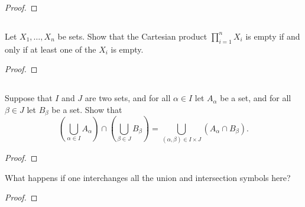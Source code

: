\documentclass[../../main.tex]{subfiles}
\begin{document}
\begin{proof}
    
\end{proof}
\begin{xx}
    
\end{xx}

\subsection{}
\begin{q}
    Let $X_1, \ldots, X_n$ be sets. Show that the Cartesian product $\prod_{i=1}^n X_i$ is empty if and only if at least one of the $X_i$ is empty.
\end{q}

\begin{proof}
    
\end{proof}
\begin{xx}
    
\end{xx}

\subsection{}
\begin{q}
    Suppose that $I$ and $J$ are two sets, and for all $\alpha \in I$ let $A_{\alpha}$ be a set, and for all $\beta \in J$ let $B_{\beta}$ be a set. Show that
        \[
        \left(\bigcup_{\alpha \in I} A_{\alpha}\right) \cap \left(\bigcup_{\beta \in J} B_{\beta}\right) = \bigcup_{(\alpha, \beta) \in I \times J} \left(A_{\alpha} \cap B_{\beta}\right).
        \]
\end{q}

\begin{proof}
    
\end{proof}
\begin{xx}
    
\end{xx}
        
\begin{q}
    What happens if one interchanges all the union and intersection symbols here?
\end{q}

\begin{ans}
    
\end{ans}
    
\begin{proof}
    
\end{proof}
\begin{xx}
    
\end{xx}
\end{document}
